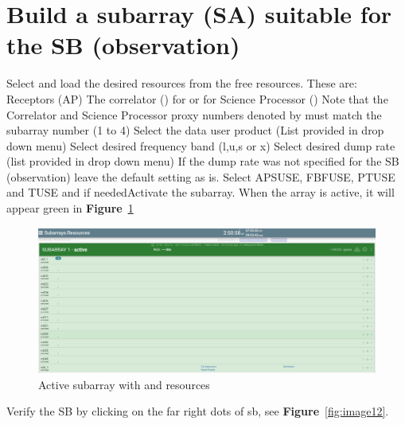 \section{ Build a subarray (SA) suitable for the SB (observation)}
Select and load the desired resources from the free resources. These are:
Receptors (AP)
The correlator () for  or  for 
Science Processor ()
Note that the Correlator and Science Processor proxy numbers denoted by  must match the subarray number (1 to 4) 
Select the data user product (List provided in drop down menu) 
Select desired frequency band (l,u,s or x)
Select desired dump rate (list provided in drop down menu)
If the dump rate was not specified for the SB (observation) leave the default setting as is.
Select APSUSE, FBFUSE, PTUSE and TUSE and if neededActivate the subarray. When the array is active, it will appear green in \textbf{Figure}~\ref{fig:image113}
\begin{figure}[!thb]
	\centering
	\includegraphics[scale=0.25]{Chapters/images/image113.png}
	
	\caption{Active subarray with and  resources}
	\label{fig:image113}
\end{figure}

Verify the SB by clicking on the far right dots of sb, see \textbf{Figure}~\ref{fig:image12}.


